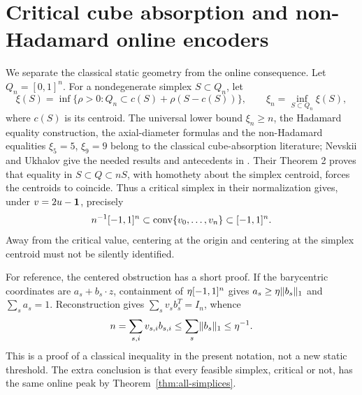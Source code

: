 \section{Critical cube absorption and non-Hadamard online encoders}
\label{sec:critical}
We separate the classical static geometry from the online consequence.
Let $Q_n=[0,1]^n$. For a nondegenerate simplex $S\subset Q_n$, let
\[
 \xi(S)=\inf\{\rho>0:Q_n\subset c(S)+\rho(S-c(S))\},
 \qquad \xi_n=\inf_{S\subset Q_n}\xi(S),
\]
where $c(S)$ is its centroid. The universal lower bound $\xi_n\ge n$,
the Hadamard equality construction, the axial-diameter formulas and the
non-Hadamard equalities $\xi_5=5$, $\xi_9=9$ belong to the classical
cube-absorption literature; Nevskii and Ukhalov give the needed results
and antecedents in \cite{NU}. Their Theorem 2 proves that equality in
$S\subset Q\subset nS$, with homothety about the simplex centroid,
forces the centroids to coincide. Thus a critical simplex in their
normalization gives, under $v=2u-\mathbf1$, precisely
\begin{equation}\label{eq:critical-inclusion}
       n^{-1}[-1,1]^n\subset\operatorname{conv}\{v_0,\ldots,v_n\}\subset[-1,1]^n.
\end{equation}
Away from the critical value, centering at the origin and centering at
the simplex centroid must not be silently identified.

For reference, the centered obstruction has a short proof. If the
barycentric coordinates are $a_s+b_s\cdot z$, containment of
$\eta[-1,1]^n$ gives $a_s\ge\eta\lVert b_s\rVert_1$ and $\sum_sa_s=1$.
Reconstruction gives $\sum_s v_sb_s^T=I_n$, whence
\begin{equation}\label{eq:critical-trace}
       n=\sum_{s,i}v_{s,i}b_{s,i}
          \le\sum_s\lVert b_s\rVert_1\le\eta^{-1}.
\end{equation}
This is a proof of a classical inequality in the present notation, not
a new static threshold. The extra conclusion is that every feasible
simplex, critical or not, has the same online peak by
Theorem~\ref{thm:all-simplices}.


